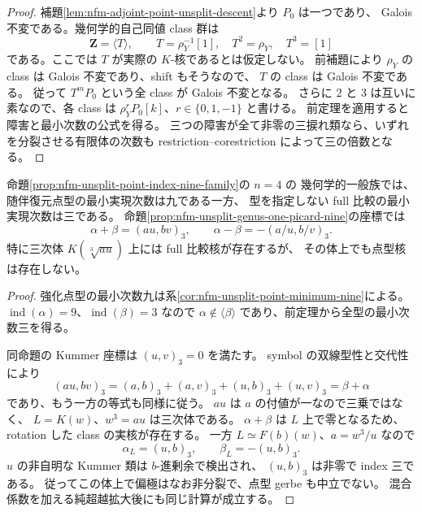 \begin{proof}
補題\ref{lem:nfm-adjoint-point-unsplit-descent}より $P_0$ は一つであり、
Galois 不変である。幾何学的自己同値 class 群は
\[
 \mathbf Z=\langle T\rangle,\qquad
 T=\rho_Y^{-1}[1],\quad T^2=\rho_Y,\quad T^3=[1]
\]
である。ここでは $T$ が実際の $K$-核であるとは仮定しない。
前補題により $\rho_Y$ の class は Galois 不変であり、shift もそうなので、
$T$ の class は Galois 不変である。
従って $T^mP_0$ という全 class が Galois 不変となる。
さらに $2$ と $3$ は互いに素なので、各 class は
$\rho_Y^rP_0[k]$、$r\in\{0,1,-1\}$ と書ける。
前定理を適用すると障害と最小次数の公式を得る。
三つの障害が全て非零の三捩れ類なら、いずれを分裂させる有限体の次数も
restriction--corestriction によって三の倍数となる。
\end{proof}

\begin{corollary}
\label{cor:nfm-unsplit-nine-versus-three}
命題\ref{prop:nfm-unsplit-point-index-nine-family}の $n=4$ の
幾何学的一般族では、随伴復元点型の最小実現次数は九である一方、
型を指定しない full 比較の最小実現次数は三である。
命題\ref{prop:nfm-unsplit-genus-one-picard-nine}の座標では
\begin{equation}\label{eq:nfm-unsplit-rotated-symbols}
 \alpha+\beta=(au,bv)_3,
 \qquad
 \alpha-\beta=-(a/u,b/v)_3.
\end{equation}
特に三次体 $K(\sqrt[3]{au})$ 上には full 比較核が存在するが、
その体上でも点型核は存在しない。
\end{corollary}

\begin{proof}
強化点型の最小次数九は系\ref{cor:nfm-unsplit-point-minimum-nine}による。
$\operatorname{ind}(\alpha)=9$、$\operatorname{ind}(\beta)=3$ なので
$\alpha\notin\langle\beta\rangle$ であり、前定理から全型の最小次数三を得る。

同命題の Kummer 座標は $(u,v)_3=0$ を満たす。
symbol の双線型性と交代性により
\[
 (au,bv)_3=(a,b)_3+(a,v)_3+(u,b)_3+(u,v)_3
             =\beta+\alpha
\]
であり、もう一方の等式も同様に従う。
$au$ は $a$ の付値が一なので三乗ではなく、
$L=K(w)$、$w^3=au$ は三次体である。
$\alpha+\beta$ は $L$ 上で零となるため、rotation した class の実核が存在する。
一方 $L\simeq F(b)(w)$、$a=w^3/u$ なので
\[
 \alpha_L=(u,b)_3,\qquad \beta_L=-(u,b)_3.
\]
$u$ の非自明な Kummer 類は $b$-進剰余で検出され、
$(u,b)_3$ は非零で index 三である。
従ってこの体上で偏極はなお非分裂で、点型 gerbe も中立でない。
混合係数を加える純超越拡大後にも同じ計算が成立する。
\end{proof}
